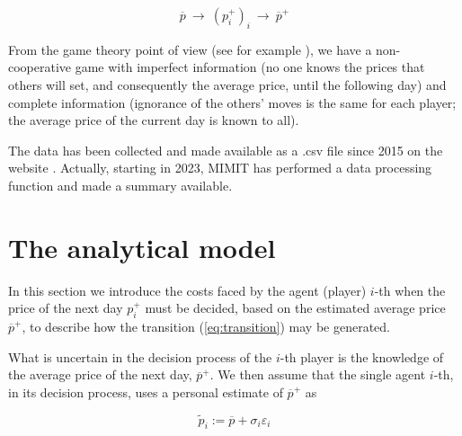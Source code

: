 \documentclass[graybox]{svmult}
\begin{document}
\begin{equation}
\label{eq:transition}
\overline p\ \longrightarrow\ \left(p_i^+\right)_i\ \longrightarrow\ \overline p^+
\end{equation}

From the game theory point of view (see for example \cite{pet}), we have a non-cooperative game
with imperfect information (no one knows the prices that
others will set, and consequently the average price, until the following day) and complete information
(ignorance of the others' moves is the same for each player; the average price of the
current day is known to all).

The data has been collected and made available as a .csv file since 2015 on the website \cite{dati}.
Actually, starting in 2023, MIMIT has performed a data processing function and
made a summary available. %










\section{The analytical model}
\label{sec:analytic}

In this section we introduce the costs faced by the agent (player) $i$-th when the price of the next day $p_i^+$ must be decided, based on the estimated average price $\overline p^+$, to describe how the transition (\ref{eq:transition}) may be generated.

What is uncertain in the decision process of the $i$-th player is the knowledge of the average price of the next day, $\overline p^+$. We then assume that the single agent $i$-th, in its decision process,  uses a personal estimate of $\overline p^+$ as

\begin{equation}
\label{eq:tildap}
\tilde p_i:=\overline p+\sigma_i\varepsilon_i
\end{equation}
\end{document}
